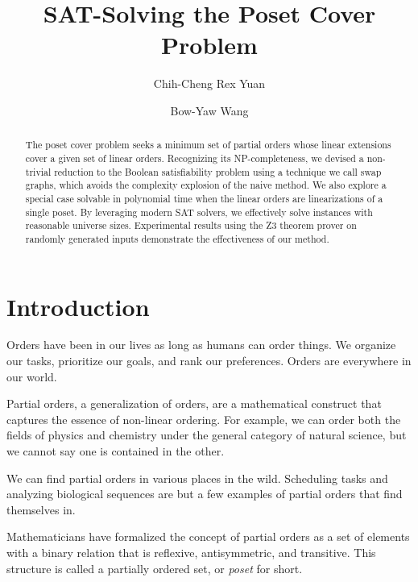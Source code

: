 \documentclass[12pt]{llncs}
\begin{document}
\title{SAT-Solving the Poset Cover Problem}

\author{Chih-Cheng Rex Yuan \and
        Bow-Yaw Wang}


\maketitle

\begin{abstract}
The poset cover problem seeks a minimum set of partial orders whose linear extensions cover a given set of linear orders. Recognizing its NP-completeness, we devised a non-trivial reduction to the Boolean satisfiability problem using a technique we call swap graphs, which avoids the complexity explosion of the naive method. We also explore a special case solvable in polynomial time when the linear orders are linearizations of a single poset. By leveraging modern SAT solvers, we effectively solve instances with reasonable universe sizes. Experimental results using the Z3 theorem prover on randomly generated inputs demonstrate the effectiveness of our method.
\end{abstract}

\section{Introduction}

Orders have been in our lives as long as humans can order things. We organize our tasks, prioritize our goals, and rank our preferences. Orders are everywhere in our world.

Partial orders, a generalization of orders, are a mathematical construct that captures the essence of non-linear ordering. For example, we can order both the fields of physics and chemistry under the general category of natural science, but we cannot say one is contained in the other.

We can find partial orders in various places in the wild. Scheduling tasks and analyzing biological sequences are but a few examples of partial orders that find themselves in\cite{heath2013poset,fernandez2013mining}.

Mathematicians have formalized the concept of partial orders as a set of elements with a binary relation that is reflexive, antisymmetric, and transitive. This structure is called a partially ordered set, or \emph{poset} for short.
\end{document}
